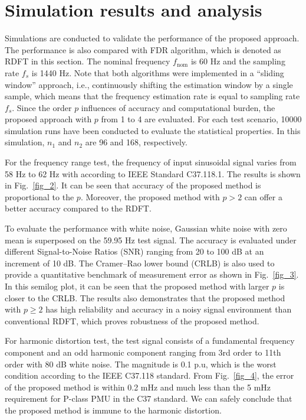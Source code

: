 \documentclass[journal,twoside]{IEEEtran}
\begin{document}
\section{Simulation results and analysis}
Simulations are conducted to validate the performance of the proposed approach. The performance is also compared with FDR algorithm\cite{chenjian,7265090}, which is denoted as RDFT in this section. The nominal frequency $f_\mathrm{nom}$ is 60 Hz and the sampling rate $f_s$ is 1440 Hz. Note that both algorithms were implemented in a “sliding window” approach, i.e., continuously shifting the estimation window by a single sample, which means that the frequency estimation rate is equal to sampling rate $f_s$. Since the order $p$ influences of accuracy and computational burden, the proposed approach with $p$ from 1 to 4 are evaluated. For each test scenario, 10000 simulation runs have been conducted to evaluate the statistical properties. In this simulation, $n_1$ and $n_2$ are 96 and 168, respectively.

For the frequency range test, the  frequency of  input sinusoidal signal  varies from 58 Hz to 62 Hz with according to IEEE Standard C37.118.1. The results is shown in  Fig.~\ref{fig_2}.  It can be seen that accuracy of the proposed method is proportional to the $p$. Moreover, the proposed method with  $p>2$ can offer a better accuracy compared to the RDFT.

To evaluate the performance with white noise, Gaussian white noise with zero mean is superposed on the 59.95 Hz test signal. The accuracy is evaluated under different Signal-to-Noise Ratios (SNR) ranging from 20 to 100 dB at an increment of 10 dB. The Cramer–Rao lower bound (CRLB) is also used to provide a quantitative benchmark of measurement error as shown in Fig.~\ref{fig_3}. In this semilog plot, it can be seen that the proposed method with larger $p$ is closer to the CRLB. The results also  demonstrates that the  proposed method with $p\geq2$ has high reliability and accuracy in a noisy signal environment than conventional RDFT, which proves robustness of the proposed method.

For harmonic distortion test, the test signal consists of a fundamental frequency component and an odd harmonic component ranging from 3rd order  to 11th order with 80 dB white noise. The magnitude is 0.1 p.u, which is the worst condition according to the IEEE  C37.118 standard\cite{c37}. From Fig.~\ref{fig_4}, the error of the proposed method is within 0.2 mHz and much less than the 5 mHz requirement for P-class PMU in the C37 standard. We can safely conclude that the proposed method is immune to the harmonic distortion.
\end{document}
